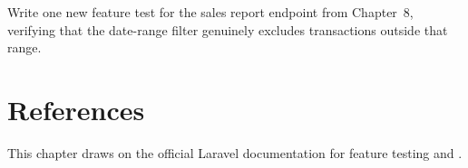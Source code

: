 \begin{challengebox}
Write one new feature test for the sales report endpoint from
Chapter~8, verifying that the date-range filter genuinely excludes
transactions outside that range.
\end{challengebox}

\section{References}

This chapter draws on the official Laravel documentation
\cite{laraveldocs} for feature testing and .
